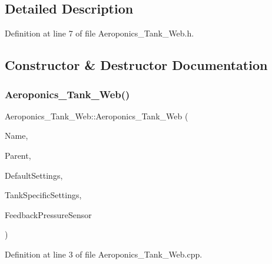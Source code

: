 \subsection{Detailed Description}


Definition at line 7 of file Aeroponics\+\_\+\+Tank\+\_\+\+Web.\+h.



\subsection{Constructor \& Destructor Documentation}
\mbox{\label{class_aeroponics___tank___web_ad54536abd76cc156d1d59b55750074de}} 
\subsubsection{\texorpdfstring{Aeroponics\+\_\+\+Tank\+\_\+\+Web()}{Aeroponics\_Tank\_Web()}}
{\footnotesize\ttfamily Aeroponics\+\_\+\+Tank\+\_\+\+Web\+::\+Aeroponics\+\_\+\+Tank\+\_\+\+Web (\begin{DoxyParamCaption}\item[{const \+\_\+\+\_\+\+Flash\+String\+Helper $\ast$}]{Name,  }\item[{\hyperlink{class_module___web}{Module\+\_\+\+Web} $\ast$}]{Parent,  }\item[{\hyperlink{struct_settings_1_1_aeroponics_settings}{Settings\+::\+Aeroponics\+Settings} $\ast$}]{Default\+Settings,  }\item[{\hyperlink{struct_settings_1_1_aeroponics_settings___tank_specific}{Settings\+::\+Aeroponics\+Settings\+\_\+\+Tank\+Specific} $\ast$}]{Tank\+Specific\+Settings,  }\item[{\hyperlink{class_pressure_sensor}{Pressure\+Sensor} $\ast$}]{Feedback\+Pressure\+Sensor }\end{DoxyParamCaption})}



Definition at line 3 of file Aeroponics\+\_\+\+Tank\+\_\+\+Web.\+cpp.

